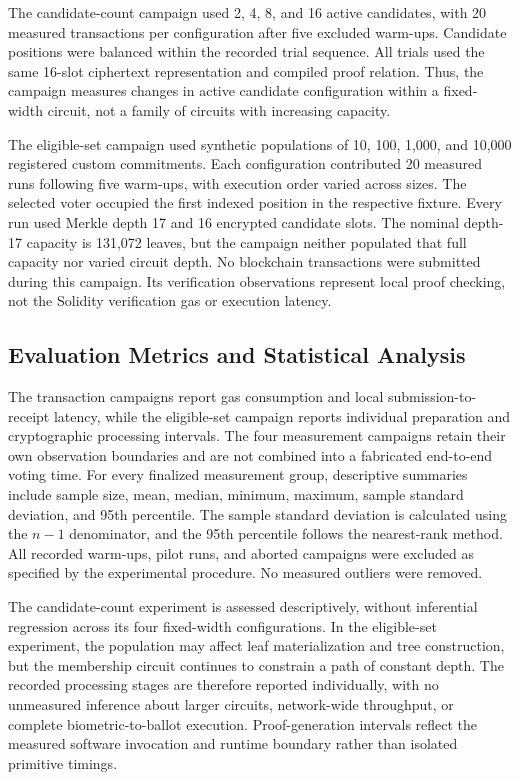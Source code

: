 The candidate-count campaign used 2, 4, 8, and 16 active
candidates, with 20 measured transactions per configuration
after five excluded warm-ups. Candidate positions were balanced
within the recorded trial sequence. All trials used the same
16-slot ciphertext representation and compiled proof relation.
Thus, the campaign measures changes in active candidate
configuration within a fixed-width circuit, not a family of
circuits with increasing capacity.

The eligible-set campaign used synthetic populations of
10, 100, 1,000, and 10,000 registered custom commitments.
Each configuration contributed 20 measured runs following
five warm-ups, with execution order varied across sizes.
The selected voter occupied the first indexed position in
the respective fixture. Every run used Merkle depth 17 and
16 encrypted candidate slots. The nominal depth-17 capacity
is 131,072 leaves, but the campaign neither populated that
full capacity nor varied circuit depth. No blockchain
transactions were submitted during this campaign. Its
verification observations represent local proof checking,
not the Solidity verification gas or execution latency.

\subsection{Evaluation Metrics and Statistical Analysis}
\label{subsec:experimental-analysis}

The transaction campaigns report gas consumption and local
submission-to-receipt latency, while the eligible-set campaign
reports individual preparation and cryptographic processing
intervals. The four measurement campaigns retain their own
observation boundaries and are not combined into a fabricated
end-to-end voting time. For every finalized measurement group,
descriptive summaries include sample size, mean, median,
minimum, maximum, sample standard deviation, and
95th percentile. The sample standard deviation is calculated
using the $n-1$ denominator, and the 95th percentile follows
the nearest-rank method. All recorded warm-ups, pilot runs,
and aborted campaigns were excluded as specified by the
experimental procedure. No measured outliers were removed.

The candidate-count experiment is assessed descriptively,
without inferential regression across its four fixed-width
configurations. In the eligible-set experiment, the population
may affect leaf materialization and tree construction, but
the membership circuit continues to constrain a path of
constant depth. The recorded processing stages are therefore
reported individually, with no unmeasured inference about
larger circuits, network-wide throughput, or complete
biometric-to-ballot execution. Proof-generation intervals
reflect the measured software invocation and runtime
boundary rather than isolated primitive timings.

